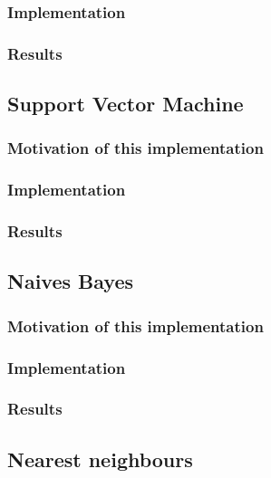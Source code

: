 \documentclass{article}
\begin{document}
    \subsubsection{Implementation}

    \subsubsection{Results}

    \subsection{Support Vector Machine}\label{subsec:support-vector-machine}

    \subsubsection{Motivation of this implementation}

    \subsubsection{Implementation}

    \subsubsection{Results}

    \subsection{Naives Bayes}\label{subsec:naives-bayes}

    \subsubsection{Motivation of this implementation}

    \subsubsection{Implementation}

    \subsubsection{Results}

    \subsection{Nearest neighbours}\label{subsec:nearest-neigbours}
\end{document}
